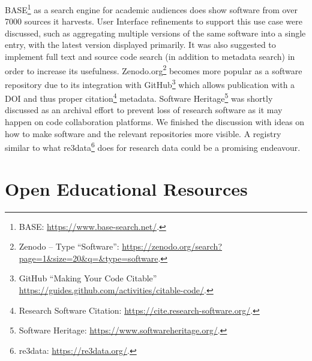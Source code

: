\documentclass[a4paper,
fontsize=11pt,
oneside,
numbers=noperiodatend,
parskip=half-,
bibliography=totoc,
final
]{scrartcl}
\begin{document}
BASE\footnote{BASE: \url{https://www.base-search.net/}.} as a search
engine for academic audiences does show software from over 7000 sources
it harvests. User Interface refinements to support this use case were
discussed, such as aggregating multiple versions of the same software
into a single entry, with the latest version displayed primarily. It was
also suggested to implement full text and source code search (in
addition to metadata search) in order to increase its usefulness.
Zenodo.org\footnote{Zenodo -- Type ``Software'':
  \url{https://zenodo.org/search?page=1\&size=20\&q=\&type=software}.}
becomes more popular as a software repository due to its integration
with GitHub\footnote{GitHub ``Making Your Code Citable''
  \url{https://guides.github.com/activities/citable-code/}.} which
allows publication with a DOI and thus proper citation\footnote{Research
  Software Citation: \url{https://cite.research-software.org/}.}
metadata. Software Heritage\footnote{Software Heritage:
  \url{https://www.softwareheritage.org/}.} was shortly discussed as an
archival effort to prevent loss of research software as it may happen on
code collaboration platforms. We finished the discussion with ideas on
how to make software and the relevant repositories more visible. A
registry similar to what re3data\footnote{re3data:
  \url{https://re3data.org/}.} does for research data could be a
promising endeavour.

\hypertarget{open-educational-resources}{%
\section{Open Educational
Resources}\label{open-educational-resources}}
\end{document}
